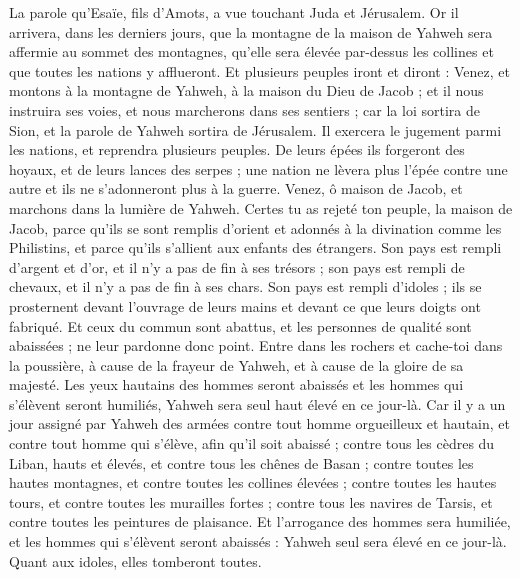 \begin{multicols}{2}
\VerseOne{}La parole qu'Esaïe, fils d'Amots, a vue touchant Juda et Jérusalem.
Or il arrivera, dans les derniers jours, que la montagne de la maison de Yahweh sera affermie au sommet des montagnes, qu'elle sera élevée par-dessus les collines et que toutes les nations y afflueront.
Et plusieurs peuples iront et diront : Venez, et montons à la montagne de Yahweh, à la maison du Dieu de Jacob ; et il nous instruira ses voies, et nous marcherons dans ses sentiers ; car la loi sortira de Sion, et la parole de Yahweh sortira de Jérusalem. 
Il exercera le jugement parmi les nations, et reprendra plusieurs peuples. De leurs épées ils forgeront des hoyaux, et de leurs lances des serpes ; une nation ne lèvera plus l'épée contre une autre et ils ne s'adonneront plus à la guerre.
Venez, ô maison de Jacob, et marchons dans la lumière de Yahweh.
Certes tu as rejeté ton peuple, la maison de Jacob, parce qu'ils se sont remplis d'orient et adonnés à la divination comme les Philistins, et parce qu'ils s'allient aux enfants des étrangers.
Son pays est rempli d'argent et d'or, et il n'y a pas de fin à ses trésors ; son pays est rempli de chevaux, et il n'y a pas de fin à ses chars.
Son pays est rempli d'idoles ; ils se prosternent devant l'ouvrage de leurs mains et devant ce que leurs doigts ont fabriqué.
Et ceux du commun sont abattus, et les personnes de qualité sont abaissées ; ne leur pardonne donc point.
Entre dans les rochers et cache-toi dans la poussière, à cause de la frayeur de Yahweh, et à cause de la gloire de sa majesté.
Les yeux hautains des hommes seront abaissés et les hommes qui s'élèvent seront humiliés, Yahweh sera seul haut élevé en ce jour-là.
Car il y a un jour assigné par Yahweh des armées contre tout homme orgueilleux et hautain, et contre tout homme qui s'élève, afin qu'il soit abaissé ;
contre tous les cèdres du Liban, hauts et élevés, et contre tous les chênes de Basan ;
contre toutes les hautes montagnes, et contre toutes les collines élevées ;
contre toutes les hautes tours, et contre toutes les murailles fortes ;
contre tous les navires de Tarsis, et contre toutes les peintures de plaisance.
Et l'arrogance des hommes sera humiliée, et les hommes qui s'élèvent seront abaissés :
Yahweh seul sera élevé en ce jour-là. Quant aux idoles, elles tomberont toutes.

\end{multicols}
